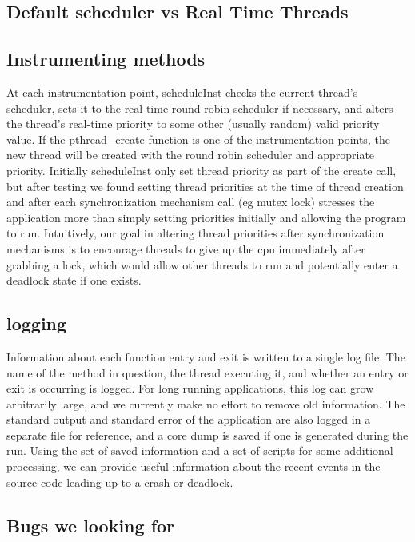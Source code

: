 \documentclass[10pt,]{article} %
\begin{document}
\subsection{Default scheduler vs Real Time Threads}



\subsection{Instrumenting methods}

At each instrumentation point, scheduleInst checks the current thread’s scheduler, sets it to the real time round robin scheduler if necessary, and alters the thread’s real-time priority to some other (usually random) valid priority value.  If the pthread\_create function is one of the instrumentation points, the new thread will be created with the round robin scheduler and appropriate priority.  Initially scheduleInst only set thread priority as part of the create call, but after testing we found setting thread priorities at the time of thread creation and after each synchronization mechanism call (eg mutex lock) stresses the application more than simply setting priorities initially and allowing the program to run.  Intuitively, our goal in altering thread priorities after synchronization mechanisms is to encourage threads to give up the cpu immediately after grabbing a lock, which would allow other threads to run and potentially enter a deadlock state if one exists. 


\subsection{logging}

Information about each function entry and exit is written to a single log file.  The name of the method in question, the thread executing it, and whether an entry or exit is occurring is logged.  For long running applications, this log can grow arbitrarily large, and we currently make no effort to remove old information.  The standard output and standard error of the application are also logged in a separate file for reference, and a core dump is saved if one is generated during the run.  Using the set of saved information and a set of scripts for some additional processing, we can provide useful information about the recent events in the source code leading up to a crash or deadlock.


\subsection{Bugs we looking for}
\end{document}
